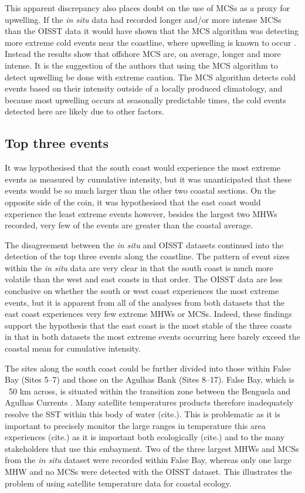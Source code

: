\documentclass[a4paper,10pt,review]{elsarticle}
\begin{document}
This apparent discrepancy also places doubt on the use of MCSs as a proxy for upwelling. If the \emph{in situ} data had recorded longer and/or more intense MCSs than the OISST data it would have shown that the MCS algorithm was detecting more extreme cold events near the coastline, where upwelling is known to occur \cite{Hutchings2009, Lutjeharms2000}. Instead the results show that offshore MCS are, on average, longer and more intense. It is the suggestion of the authors that using the MCS algorithm to detect upwelling be done with extreme caution. The MCS algorithm detects cold events based on their intensity outside of a locally produced climatology, and because most upwelling occurs at seasonally predictable times, the cold events detected here are likely due to other factors.

\subsection{Top three events}
It was hypothesised that the south coast would experience the most extreme events as measured by cumulative intensity, but it was unanticipated that these events would be so much larger than the other two coastal sections. On the opposite side of the coin, it was hypothesised that the east coast would experience the least extreme events however, besides the largest two MHWs recorded, very few of the events are greater than the coastal average.

The disagreement between the \emph{in situ} and OISST datasets continued into the detection of the top three events along the coastline. The pattern of event sizes within the \emph{in situ} data are very clear in that the south coast is much more volatile than the west and east coasts in that order. The OISST data are less conclusive on whether the south or west coast experiences the most extreme events, but it is apparent from all of the analyses from both datasets that the east coast experiences very few extreme MHWs or MCSs. Indeed, these findings support the hypothesis that the east coast is the most stable of the three coasts in that in both datasets the most extreme events occurring here barely exceed the coastal mean for cumulative intensity.

The sites along the south coast could be further divided into those within False Bay (Sites 5--7) and those on the Agulhas Bank (Sites 8--17). False Bay, which is ~50 km across, is situated within the transition zone between the Benguela and Agulhas Currents \cite{Smit2013}. Many satellite temperatures products therefore inadequately resolve the SST within this body of water (cite.). This is problematic as it is important to precisely monitor the large ranges in temperature this area experiences (cite.) as it is important both ecologically (cite.) and to the many stakeholders that use this embayment. Two of the three largest MHWs and MCSs from the \emph{in situ} dataset were recorded within False Bay, whereas only one large MHW and no MCSs were detected with the OISST dataset. This illustrates the problem of using satellite temperature data for coastal ecology.
\end{document}
